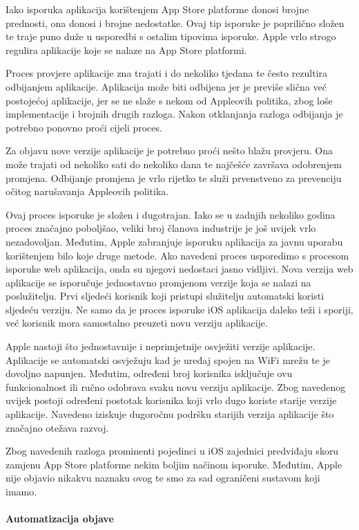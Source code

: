 \documentclass[times, utf8, diplomski, numeric]{fer}
\begin{document}
Iako isporuka aplikacija korištenjem App Store platforme donosi brojne prednosti, ona donosi i brojne nedostatke. Ovaj tip isporuke je poprilično složen te traje puno duže u usporedbi s ostalim tipovima isporuke. Apple vrlo strogo regulira aplikacije koje se nalaze na App Store platformi.

Proces provjere aplikacije zna trajati i do nekoliko tjedana te često rezultira odbijanjem aplikacije. Aplikacija može biti odbijena jer je previše slična već postojećoj aplikacije, jer se ne slaže s nekom od Appleovih politika, zbog loše implementacije i brojnih drugih razloga. Nakon otklanjanja razloga odbijanja je potrebno ponovno proći cijeli proces.

Za objavu nove verzije aplikacije je potrebno proći nešto blažu provjeru. Ona može trajati od nekoliko sati do nekoliko dana te najčešće završava odobrenjem promjena. Odbijanje promjena je vrlo rijetko te služi prvenstveno za prevenciju očitog narušavanja Appleovih politika.

Ovaj proces isporuke je složen i dugotrajan. Iako se u zadnjih nekoliko godina proces značajno poboljšao, veliki broj članova industrije je još uvijek vrlo nezadovoljan. Međutim, Apple zabranjuje isporuku aplikacija za javnu uporabu korištenjem bilo koje druge metode. Ako navedeni proces usporedimo s procesom isporuke web aplikacija, onda su njegovi nedostaci jasno vidljivi. Nova verzija web aplikacije se isporučuje jednostavno promjenom verzije koja se nalazi na poslužitelju. Prvi sljedeći korisnik koji pristupi služitelju automatski koristi sljedeću verziju. Ne samo da je proces isporuke iOS aplikacija daleko teži i sporiji, već korisnik mora samostalno preuzeti novu verziju aplikacije.

Apple nastoji što jednostavnije i neprimjetnije osvježiti verzije aplikacije. Aplikacije se automatski osvježuju kad je uređaj spojen na WiFi mrežu te je dovoljno napunjen. Međutim, određeni broj korisnika isključuje ovu funkcionalnost ili ručno odobrava svaku novu verziju aplikacije. Zbog navedenog uvijek postoji određeni postotak korisnika koji vrlo dugo koriste starije verzije aplikacije. Navedeno iziskuje dugoročnu podršku starijih verzija aplikacije što značajno otežava razvoj.

Zbog navedenih razloga prominenti pojedinci u iOS zajednici predviđaju skoru zamjenu App Store platforme nekim boljim načinom isporuke. Međutim, Apple nije objavio nikakvu naznaku ovog te smo za sad ograničeni sustavom koji imamo.

\paragraph{Automatizacija objave}
\end{document}
